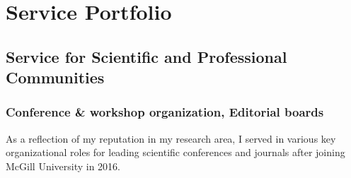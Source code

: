 \chapter{Service Portfolio}

\section{Service for Scientific and Professional Communities}



\subsection{Conference \& workshop organization, Editorial boards}

As a reflection of my reputation in my research area, I served in various key organizational roles for leading scientific conferences and journals after joining McGill University in 2016. 

